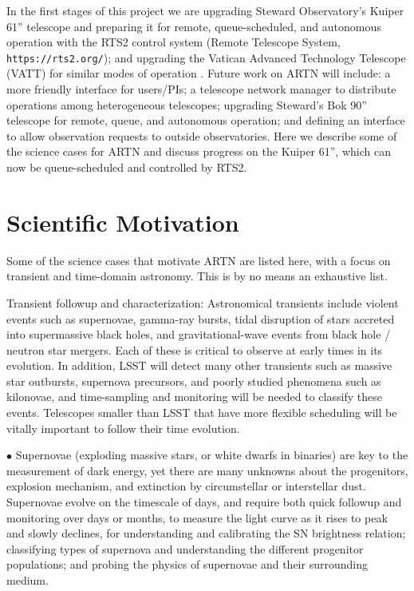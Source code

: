\documentclass[]{spie}  %
\begin{document}
In the first stages of this project we are upgrading Steward Observatory's Kuiper 61'' telescope and preparing it for remote, queue-scheduled, and autonomous operation with the RTS2 control system\cite{Kubanek08, Kubanek16} (Remote Telescope System, {\tt https://rts2.org/}); and upgrading the Vatican Advanced Technology Telescope (VATT) for similar modes of operation \cite{Swindell17}.  Future work on ARTN will include: a more friendly interface for users/PIs;  a telescope network manager to distribute operations among heterogeneous telescopes; upgrading Steward's Bok 90'' telescope for remote, queue, and autonomous operation; and defining an interface to allow observation requests to outside observatories. Here we describe some of the science cases for ARTN and discuss progress on the Kuiper 61'', which can now be queue-scheduled and controlled by RTS2.



\section{Scientific Motivation}

Some of the science cases that motivate ARTN are listed here, with a focus on transient and time-domain astronomy. This is by no means an exhaustive list.

Transient followup and characterization: Astronomical transients include violent events such as supernovae, gamma-ray bursts, tidal disruption of stars accreted into supermassive black holes, and gravitational-wave events from black hole / neutron star mergers.  Each of these is critical to observe at early times in its evolution. In addition, LSST will detect many other transients such as massive star outbursts, supernova precursors, and poorly studied phenomena such as kilonovae, and time-sampling and monitoring will be needed to classify these events. Telescopes smaller than LSST that have more flexible scheduling will be vitally important to follow their time evolution.

$\bullet$ Supernovae (exploding massive stars, or white dwarfs in binaries) are key to the measurement of dark energy, yet there are many unknowns about the progenitors, explosion mechanism, and extinction by circumstellar or interstellar dust. Supernovae evolve on the timescale of days, and require both quick followup and monitoring over days or months, to measure the light curve as it rises to peak and slowly declines, for understanding and calibrating the SN brightness relation; classifying types of supernova and understanding the different progenitor populations; and probing the physics of supernovae and their surrounding medium.  
\end{document}
